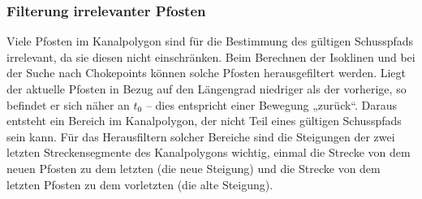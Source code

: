 \subsubsection{Filterung irrelevanter Pfosten}
\label{sec:ende_2}
Viele Pfosten im Kanalpolygon sind für die Bestimmung des gültigen Schusspfads irrelevant, da sie diesen nicht einschränken. Beim Berechnen der Isoklinen und bei der Suche nach Chokepoints können solche Pfosten herausgefiltert werden. Liegt der aktuelle Pfosten in Bezug auf den Längengrad niedriger als der vorherige, so befindet er sich näher an \(t_0\) – dies entspricht einer Bewegung „zurück“. Daraus entsteht ein Bereich im Kanalpolygon, der nicht Teil eines gültigen Schusspfads sein kann. Für das Herausfiltern solcher Bereiche sind die Steigungen der zwei letzten Streckensegmente des Kanalpolygons wichtig, einmal die Strecke von dem neuen Pfosten zu dem letzten (die neue Steigung) und die Strecke von dem letzten Pfosten zu dem vorletzten (die alte Steigung).


